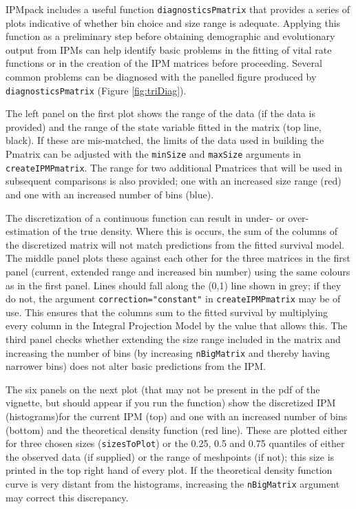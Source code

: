 \documentclass{article}
\begin{document}
IPMpack includes a useful function {\tt diagnosticsPmatrix} that provides a
series of plots indicative of whether bin choice and size range is adequate.
Applying this function as a preliminary step before obtaining demographic and evolutionary output from IPMs can help identify basic problems in the fitting of vital rate functions or in the creation of the IPM matrices before proceeding. Several common problems can be diagnosed with the panelled figure produced by {\tt diagnosticsPmatrix} (Figure
\ref{fig:triDiag}).

The left panel on the first plot shows the range of the data (if the data is provided) and the range of the state variable fitted in the matrix (top line, black).  If these are mis-matched, the limits of the data used in building the Pmatrix can be adjusted with the {\tt minSize} and {\tt maxSize} arguments in {\tt createIPMPmatrix}.  The range for two additional Pmatrices that will be used in subsequent comparisons is also provided; one with an increased size range (red) and one with an increased number of bins (blue). 

The discretization of a continuous function can result in under- or over-estimation of the true density. Where this is occurs, the sum of the columns of the discretized matrix will not match predictions from the fitted survival model.  The middle panel 
plots these against each other for the three matrices in the first panel (current, extended range and increased bin number) using the same colours as in the first panel. Lines should fall along the (0,1) line shown in grey; if they do not, the argument {\tt correction="constant"} in {\tt createIPMPmatrix} may be of use. This ensures that the columns sum to the fitted survival by multiplying every column in the Integral Projection Model by the value that allows this. The third panel checks whether extending the size range included in the matrix and increasing the number of bins (by increasing {\tt nBigMatrix} and thereby having narrower bins) does not alter basic predictions from the IPM.

The six panels on the next plot (that may not be present in the pdf of the vignette, but should appear if you run the function) show the discretized IPM (histograms)for the current IPM (top) and one with an increased number of bins (bottom)  and the
theoretical density function (red line). These are plotted either for three chosen sizes ({\tt sizesToPlot}) or the 0.25, 0.5 and 0.75 quantiles of either the observed data (if supplied) or the range of meshpoints (if not); this size is printed in the top right hand of every plot. If the theoretical density function curve is very distant from the histograms, increasing the {\tt nBigMatrix} argument may correct this discrepancy. 
\end{document}
